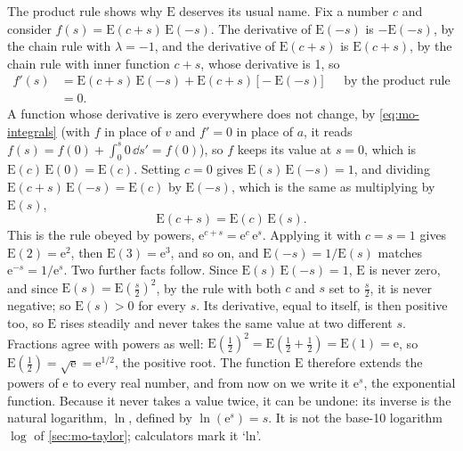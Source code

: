 The product rule shows why $\mathrm{E}$ deserves its usual name. Fix a
number $c$ and consider $f(s) = \mathrm{E}(c + s)\,\mathrm{E}(-s)$. The
derivative of $\mathrm{E}(-s)$ is $-\mathrm{E}(-s)$, by the chain rule
with $\lambda = -1$, and the derivative of $\mathrm{E}(c + s)$ is
$\mathrm{E}(c + s)$, by the chain rule with inner function $c + s$, whose
derivative is 1, so
\begin{align*}
   f'(s) &= \mathrm{E}(c+s)\,\mathrm{E}(-s)
      + \mathrm{E}(c+s)\,\bigl[-\mathrm{E}(-s)\bigr]
      && \text{by the product rule}\\
   &= 0 .
\end{align*}
A function whose derivative is zero everywhere does not change, by
\cref{eq:mo-integrals} (with $f$ in place of $v$ and $f' = 0$ in place
of $a$, it reads $f(s) = f(0) + \int_0^s 0\,\dd s' = f(0)$), so $f$ keeps its value at $s = 0$, which is
$\mathrm{E}(c)\,\mathrm{E}(0) = \mathrm{E}(c)$. Setting $c = 0$ gives
$\mathrm{E}(s)\,\mathrm{E}(-s) = 1$, and dividing $\mathrm{E}(c+s)\,
\mathrm{E}(-s) = \mathrm{E}(c)$ by $\mathrm{E}(-s)$, which is the same as
multiplying by $\mathrm{E}(s)$,
\begin{equation*}
   \mathrm{E}(c + s) = \mathrm{E}(c)\,\mathrm{E}(s) .
\end{equation*}
This is the rule obeyed by powers, $\mathrm{e}^{c+s} =
\mathrm{e}^c\,\mathrm{e}^s$. Applying it with $c = s = 1$ gives
$\mathrm{E}(2) = \mathrm{e}^2$, then $\mathrm{E}(3) = \mathrm{e}^3$, and
so on, and $\mathrm{E}(-s) = 1/\mathrm{E}(s)$ matches $\mathrm{e}^{-s} =
1/\mathrm{e}^s$. Two further facts follow. Since $\mathrm{E}(s)\,
\mathrm{E}(-s) = 1$, $\mathrm{E}$ is never zero, and since $\mathrm{E}(s)
= \mathrm{E}(\tfrac s2)^2$, by the rule with both $c$ and $s$ set to
$\tfrac s2$, it is never negative; so $\mathrm{E}(s) > 0$ for every $s$.
Its derivative, equal to itself, is then positive too, so $\mathrm{E}$
rises steadily and never takes the same value at two different $s$.
Fractions agree with powers as well: $\mathrm{E}(\tfrac12)^2 =
\mathrm{E}(\tfrac12 + \tfrac12) = \mathrm{E}(1) = \mathrm{e}$, so
$\mathrm{E}(\tfrac12) = \sqrt{\mathrm{e}} = \mathrm{e}^{1/2}$, the positive
root. The
function $\mathrm{E}$ therefore extends the powers of $\mathrm{e}$ to
every real number, and from now on we write it $\mathrm{e}^s$, the
exponential function. Because it never takes a value twice, it can be
undone: its inverse is the natural logarithm, $\ln$, defined by
$\ln(\mathrm{e}^s) = s$. It is not the base-10 logarithm $\log$ of
\cref{sec:mo-taylor}; calculators mark it `ln'.


